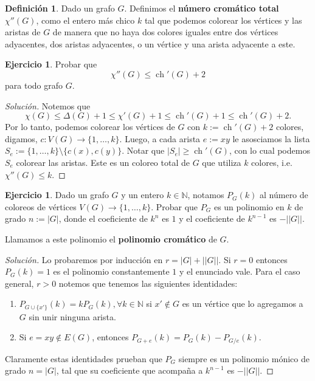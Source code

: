 \documentclass[12pt]{report}
\theoremstyle{plain}
\theoremstyle{definition}
\newtheorem{definition}[theorem]{Definición}
\newtheorem{exercise}[theorem]{Ejercicio}
\newenvironment{solution}{\begin{proof}[Solución]}{\end{proof}}
\newcommand{\naturals}{\mathbb{N}}
\newcommand{\abs}[1]{\left \vert #1 \right \vert}
\newcommand{\Abs}[1]{\left \vert \left \vert #1 \right \vert \right \vert}
\begin{document}
\begin{definition}
Dado un grafo $G$. Definimos el \textbf{número cromático total} $\chi '' (G)$, como el entero más chico $k$ tal que podemos colorear los vértices y las aristas de $G$ de manera que no haya dos colores iguales entre dos vértices adyacentes, dos aristas adyacentes, o un vértice y una arista adyacente a este.
\end{definition}

\begin{exercise}
Probar que
\[
    \chi ''(G) \leq \operatorname{ch} ' (G) + 2
\]
para todo grafo $G$.
\end{exercise}
\begin{solution}
Notemos que
\[
    \chi (G) \leq \Delta (G) + 1 \leq \chi ' (G) + 1 \leq \operatorname{ch} ' (G) + 1 \leq \operatorname{ch} ' (G) + 2.
\]
Por lo tanto, podemos colorear los vértices de $G$ con $k := \operatorname{ch}' (G) + 2$ colores, digamos, $c : V(G) \rightarrow \{1, \ldots, k\}$. Luego, a cada arista $e:= xy$ le asosciamos la lista $S_e := \{1 , \ldots, k\} \setminus \{c (x) , c(y)\}$. Notar que $\abs {S_e} \geq \operatorname{ch} ' (G)$, con lo cual podemos $S_e$ colorear las aristas. Este es un coloreo total de $G$ que utiliza $k$ colores, i.e. $\chi '' (G) \leq k$.
\end{solution}





\begin{exercise}
Dado un grafo $G$ y un entero $k \in \naturals$, notamos $P_G (k)$ al número de coloreos de vértices $V(G) \rightarrow \{1, \ldots,k\}$. Probar que $P_G$ es un polinomio en $k$ de grado $n := \abs G$, donde el coeficiente de $k^n$ es $1$ y el coeficiente de $k^{n-1}$ es $- \Abs G$.

Llamamos a este polinomio el \textbf{polinomio cromático} de $G$.
\end{exercise}
\begin{solution}
Lo probaremos por inducción en $r = \abs G + \Abs G$. Si $r = 0$ entonces $P_G (k) = 1$ es el polinomio constantemente $1$ y el enunciado vale. Para el caso general, $r > 0$ notemos que tenemos las siguientes identidades:
\begin{enumerate}[(1)]
\item $P_{G \cup \{x'\}} (k) = k P_G (k), \forall k \in \naturals$ si $x' \not \in G$ es un vértice que lo agregamos a $G$ sin unir ninguna arista.
\item Si $e = xy \not \in E(G)$, entonces $P_{G + e} (k) = P_G (k) - P_{G/e} (k)$.
\end{enumerate}
Claramente estas identidades prueban que $P_G$ siempre es un polinomio mónico de grado $n = \abs G$, tal que su coeficiente que acompaña a $k^{n-1}$ es $- \Abs G$.
\end{solution}
\end{document}
